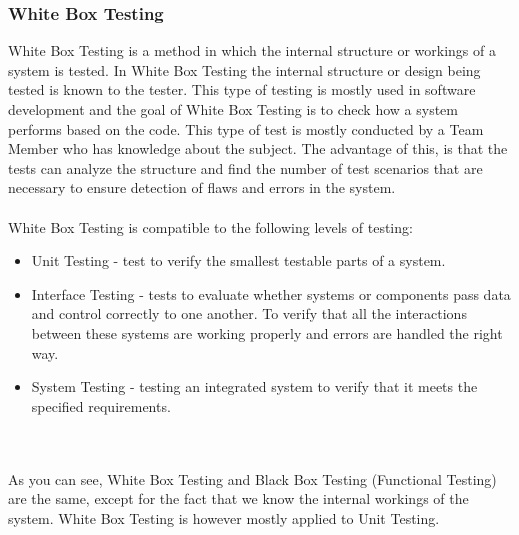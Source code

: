 \subsubsection{White Box Testing}
White Box Testing is a method in which the internal structure or workings of a system is tested. In White Box Testing the internal structure or design being tested is known to the tester. This type of testing is mostly used in software development and the goal of White Box Testing is to check how a system performs based on the code. This type of test is mostly conducted by a Team Member who has knowledge about the subject. The advantage of this, is that the tests can analyze the structure and find the number of test scenarios that are necessary to ensure detection of flaws and errors in the system. 
\\\\
White Box Testing is compatible to the following levels of testing: 
\begin{itemize}
  \item Unit Testing - test to verify the smallest testable parts of a system. 
  \item Interface Testing - tests to evaluate whether systems or components pass data and control correctly to one another. To verify that all the interactions between these systems are working properly and errors are handled the right way. 
  \item System Testing - testing an integrated system to verify that it meets the specified requirements. 
\end{itemize}
\\\\
As you can see, White Box Testing and Black Box Testing (Functional Testing) are the same, except for the fact that we know the internal workings of the system. White Box Testing is however mostly applied to Unit Testing. 